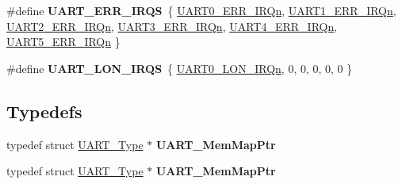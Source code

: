 \begin{DoxyCompactItemize}
\item 
\#define {\bfseries U\+A\+R\+T\+\_\+\+E\+R\+R\+\_\+\+I\+R\+QS}~\{ \hyperlink{group__Interrupt__vector__numbers_gga666eb0caeb12ec0e281415592ae89083a729bb4f0f96b0982e5170578453d54df}{U\+A\+R\+T0\+\_\+\+E\+R\+R\+\_\+\+I\+R\+Qn}, \hyperlink{group__Interrupt__vector__numbers_gga666eb0caeb12ec0e281415592ae89083a91d077221d6b9f73176e96eeb9377f33}{U\+A\+R\+T1\+\_\+\+E\+R\+R\+\_\+\+I\+R\+Qn}, \hyperlink{group__Interrupt__vector__numbers_gga666eb0caeb12ec0e281415592ae89083aaabbd86272ab26d87d346e39c4b2387b}{U\+A\+R\+T2\+\_\+\+E\+R\+R\+\_\+\+I\+R\+Qn}, \hyperlink{group__Interrupt__vector__numbers_gga666eb0caeb12ec0e281415592ae89083ad1d0270f0c91c1114b84175fbffe931c}{U\+A\+R\+T3\+\_\+\+E\+R\+R\+\_\+\+I\+R\+Qn}, \hyperlink{group__Interrupt__vector__numbers_gga666eb0caeb12ec0e281415592ae89083a69555b075331b0e36047b76b8b2f811b}{U\+A\+R\+T4\+\_\+\+E\+R\+R\+\_\+\+I\+R\+Qn}, \hyperlink{group__Interrupt__vector__numbers_gga666eb0caeb12ec0e281415592ae89083a391800e7b06537a04ea6d34f0f64d7e8}{U\+A\+R\+T5\+\_\+\+E\+R\+R\+\_\+\+I\+R\+Qn} \}\hypertarget{group__UART__Peripheral__Access__Layer_ga0f41ca62f0d44fb9c422d8cb59e4b73d}{}\label{group__UART__Peripheral__Access__Layer_ga0f41ca62f0d44fb9c422d8cb59e4b73d}

\item 
\#define {\bfseries U\+A\+R\+T\+\_\+\+L\+O\+N\+\_\+\+I\+R\+QS}~\{ \hyperlink{group__Interrupt__vector__numbers_gga666eb0caeb12ec0e281415592ae89083a30a8b8361f034bed0854379485fc95b8}{U\+A\+R\+T0\+\_\+\+L\+O\+N\+\_\+\+I\+R\+Qn}, 0, 0, 0, 0, 0 \}\hypertarget{group__UART__Peripheral__Access__Layer_ga7b216695d91eebd76957efbbf1abd00d}{}\label{group__UART__Peripheral__Access__Layer_ga7b216695d91eebd76957efbbf1abd00d}

\end{DoxyCompactItemize}
\subsection*{Typedefs}
\begin{DoxyCompactItemize}
\item 
typedef struct \hyperlink{structUART__Type}{U\+A\+R\+T\+\_\+\+Type} $\ast$ {\bfseries U\+A\+R\+T\+\_\+\+Mem\+Map\+Ptr}\hypertarget{group__UART__Peripheral__Access__Layer_ga24cbd8104c4451499cb16563e8b12b87}{}\label{group__UART__Peripheral__Access__Layer_ga24cbd8104c4451499cb16563e8b12b87}

\item 
typedef struct \hyperlink{structUART__Type}{U\+A\+R\+T\+\_\+\+Type} $\ast$ {\bfseries U\+A\+R\+T\+\_\+\+Mem\+Map\+Ptr}\hypertarget{group__UART__Peripheral__Access__Layer_ga24cbd8104c4451499cb16563e8b12b87}{}\label{group__UART__Peripheral__Access__Layer_ga24cbd8104c4451499cb16563e8b12b87}

\end{DoxyCompactItemize}


